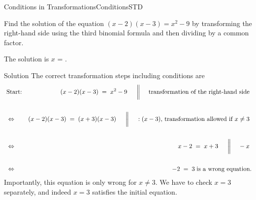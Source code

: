 \begin{MXContent}{Conditions in Transformations}{Conditions}{STD}
\begin{MExercise}
Find the solution of the equation $(x-2)(x-3)=x^2-9$ by transforming the right-hand side using the third 
binomial formula and then dividing by a common factor. 

The solution is $x$ = .

\begin{MHint}{Solution}
The correct transformation steps including conditions are
\begin{eqnarray*}
& \text{Start:} & (x-2)(x-3)\;=\; x^2-9 \ \ \ \ \MSep \ \text{transformation of the right-hand side} \ \\ \ \\
& \Leftrightarrow & (x-2)(x-3) \;=\; (x+3)(x-3) \ \ \ \ \MSep \ :(x-3)\text{, transformation allowed if }x\not=3\ \\ \ \\
& \Leftrightarrow & x-2\;=\; x+3 \ \ \ \ \MSep \ -x \ \\ \ \\
& \Leftrightarrow & -2 \;=\; 3 \; \text{is a wrong equation.}
\end{eqnarray*}
Importantly, this equation is only wrong for $x\not=3$. We have to check $x=3$ separately, and indeed 
$x=3$ satisfies the initial equation.
\end{MHint}
\end{MExercise}
\end{MXContent}


